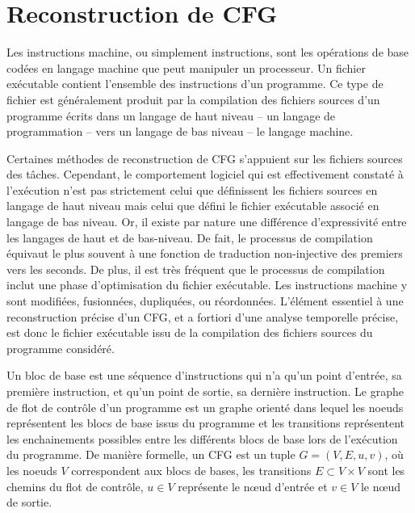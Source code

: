 \section{Reconstruction de CFG}
\label{sec:reconstruction}


  Les instructions machine, ou simplement instructions, sont les opérations de
  base codées en langage machine que peut manipuler un processeur. Un fichier
  exécutable contient l'ensemble des instructions d'un programme. Ce type de
  fichier est généralement produit par la compilation des fichiers sources d'un
  programme écrits dans un langage de haut niveau -- un langage de programmation
  -- vers un langage de bas niveau -- le langage machine.

  Certaines méthodes de reconstruction de CFG s'appuient sur les fichiers
  sources des tâches. Cependant, le comportement logiciel qui est effectivement
  constaté à l’exécution n’est pas strictement celui que définissent les
  fichiers sources en langage de haut niveau mais celui que défini le fichier
  exécutable associé en langage de bas niveau. Or, il existe par nature une
  différence d’expressivité entre les langages de haut et de bas-niveau. De
  fait, le processus de compilation équivaut le plus souvent à une fonction de
  traduction non-injective des premiers vers les seconds. De plus, il est très
  fréquent que le processus de compilation inclut une phase d'optimisation du
  fichier exécutable. Les instructions machine y sont modifiées, fusionnées,
  dupliquées, ou réordonnées. L'élément essentiel à une reconstruction précise
  d'un CFG, et a fortiori d'une analyse temporelle précise, est donc le fichier
  exécutable issu de la compilation des fichiers sources du programme considéré.

  \vspace{1em}


  Un bloc de base est une séquence d'instructions qui n'a qu'un point d'entrée,
  sa première instruction, et qu'un point de sortie, sa dernière instruction.
  Le graphe de flot de contrôle d'un programme est un graphe orienté dans lequel
  les noeuds représentent les blocs de base issus du programme et les
  transitions représentent les enchainements possibles entre les différents
  blocs de base lors de l'exécution du programme. De manière formelle, un CFG
  est un tuple $G = (V, E, u, v)$, où les noeuds $V$ correspondent aux blocs de
  bases, les transitions $E \subset V \times V$ sont les chemins du flot de
  contrôle, $u \in V$ représente le n{\oe}ud d'entrée et $v \in V$ le n{\oe}ud
  de sortie.

